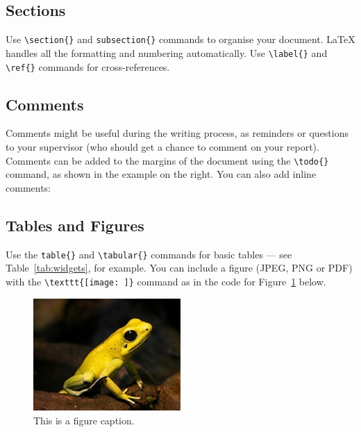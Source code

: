 \documentclass[12pt]{article}
\begin{document}
\subsection{Sections}

Use \verb$\section{}$ and \verb$subsection{}$ commands to organise your document. \LaTeX{} handles all the formatting and numbering automatically. Use \verb$\label{}$ and \verb$\ref{}$ commands for cross-references.

\subsection{Comments}

Comments might be useful during the writing process, as reminders or questions to your supervisor (who should get a chance to comment on your report). Comments can be added to the margins of the document using the  \verb$\todo{}$ command, as shown in the example on the right. You can also add inline comments:


\subsection{Tables and Figures}

Use the \verb$table{}$ and \verb$\tabular{}$ commands for basic tables --- see Table~\ref{tab:widgets}, for example. You can include a figure (JPEG, PNG or PDF) with the \verb$\texttt{[image: ]}$ command as in the code for Figure~\ref{fig:frog} below.

\begin{figure}
\centering
\includegraphics[width=0.5\textwidth]{figures/frog.jpg}
\caption{\label{fig:frog}This is a figure caption.}
\end{figure}
\end{document}
